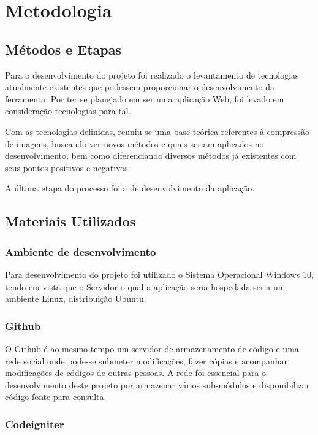 \chapter{Metodologia}
\label{c.metodologia}

\section{Métodos e Etapas}
\label{s.metodoseetapas}

Para o desenvolvimento do projeto foi realizado o levantamento de tecnologias atualmente existentes que podessem proporcionar o desenvolvimento da ferramenta. Por ter se planejado em ser uma aplicação Web, foi levado em consideração tecnologias para tal.

Com as tecnologias definidas, reuniu-se uma base teórica referentes à compressão de imagens, buscando ver novos métodos e quais seriam aplicados no desenvolvimento, bem como diferenciando diversos métodos já existentes com seus pontos positivos e negativos.

A última etapa do processo foi a de desenvolvimento da aplicação.

\section{Materiais Utilizados}
\label{s.materiaisutilizados}

\subsection{Ambiente de desenvolvimento}
\label{s.windows}

Para desenvolvimento do projeto foi utilizado o Sistema Operacional Windows 10, tendo em vista que o Servidor o qual a aplicação seria hospedada seria um ambiente Linux, distribuição Ubuntu.

\subsection{Github}
\label{s.github}

O Github é ao mesmo tempo um servidor de armazenamento de código e uma rede social onde pode-se submeter modificações, fazer cópias e acompanhar modificações de códigos de outras pessoas. A rede foi essencial para o desenvolvimento deste projeto por armazenar vários sub-módulos e disponibilizar código-fonte para consulta.

\subsection{Codeigniter}
\label{s.ci}

